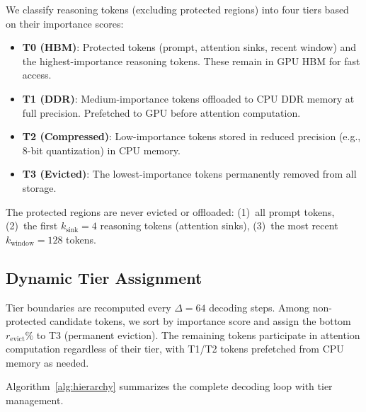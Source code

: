 \documentclass{article}
\begin{document}
We classify reasoning tokens (excluding protected regions) into four tiers based on their importance scores:

\begin{itemize}
    \item \textbf{T0 (HBM)}: Protected tokens (prompt, attention sinks, recent window) and the highest-importance reasoning tokens. These remain in GPU HBM for fast access.
    \item \textbf{T1 (DDR)}: Medium-importance tokens offloaded to CPU DDR memory at full precision. Prefetched to GPU before attention computation.
    \item \textbf{T2 (Compressed)}: Low-importance tokens stored in reduced precision (e.g., 8-bit quantization) in CPU memory.
    \item \textbf{T3 (Evicted)}: The lowest-importance tokens permanently removed from all storage.
\end{itemize}

The protected regions are never evicted or offloaded:
(1)~all prompt tokens,
(2)~the first $k_{\text{sink}}=4$ reasoning tokens (attention sinks),
(3)~the most recent $k_{\text{window}}=128$ tokens.

\subsection{Dynamic Tier Assignment}

Tier boundaries are recomputed every $\Delta=64$ decoding steps.
Among non-protected candidate tokens, we sort by importance score and assign the bottom $r_{\text{evict}}\%$ to T3 (permanent eviction).
The remaining tokens participate in attention computation regardless of their tier, with T1/T2 tokens prefetched from CPU memory as needed.

Algorithm~\ref{alg:hierarchy} summarizes the complete decoding loop with tier management.
\end{document}
